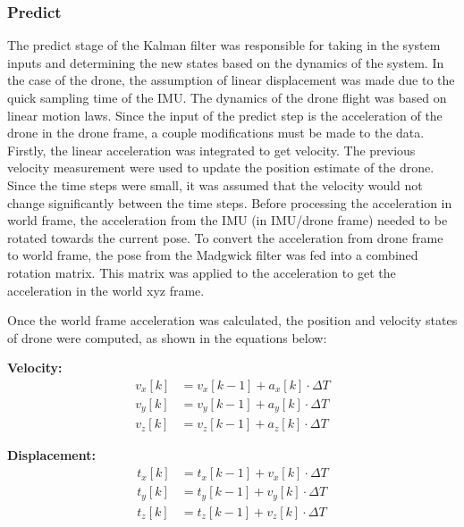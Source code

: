 \documentclass[bare_jrnl_transmag]{subfiles}
\begin{document}
 

\subsubsection{Predict}
The predict stage of the Kalman filter was responsible for taking in the system inputs and determining the new states based on the dynamics of the system. In the case of the drone, the assumption of linear displacement was made due to the quick sampling time of the IMU. The dynamics of the drone flight was based on linear motion laws. Since the input of the predict step is the acceleration of the drone in the drone frame, a couple modifications must be made to the data. Firstly, the linear acceleration was integrated to get velocity. The previous velocity measurement were used to update the position estimate of the drone. Since the time steps were small, it was assumed that the velocity would not change significantly between the time steps. 
Before processing the acceleration in world frame, the acceleration from the IMU (in IMU/drone frame) needed to be rotated towards the current pose. To convert the acceleration from drone frame to world frame, the pose from the Madgwick filter was fed into a combined rotation matrix. This matrix was applied to the acceleration to get the acceleration in the world xyz frame. \newline

Once the world frame acceleration was calculated, the position and velocity states of drone were computed, as shown in the equations below:


\noindent\textbf{Velocity:}
\begin{equation*}
\begin{aligned}
v_x[k] &= v_x[k-1] + a_x[k] \cdot \Delta T \\
v_y[k] &= v_y[k-1] + a_y[k] \cdot \Delta T \\
v_z[k] &= v_z[k-1] + a_z[k] \cdot \Delta T
\end{aligned}
\end{equation*}

\noindent\textbf{Displacement:}
\begin{equation*}
\begin{aligned}
t_x[k] &= t_x[k-1] + v_x[k] \cdot \Delta T \\
t_y[k] &= t_y[k-1] + v_y[k] \cdot \Delta T \\
t_z[k] &= t_z[k-1] + v_z[k] \cdot \Delta T
\end{aligned}
\end{equation*}
    
\end{document}
